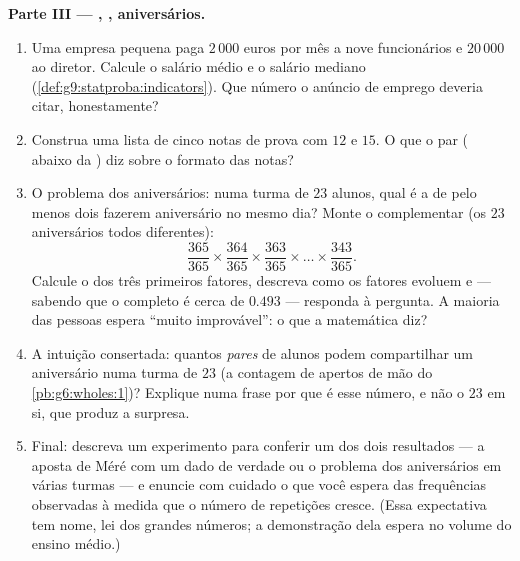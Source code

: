 \begin{problem}
\medskip
\noindent\textbf{Parte III --- , , aniversários.}
\begin{enumerate}[resume]
  \item Uma empresa pequena paga $2\,000$ euros por mês a nove
        funcionários e $20\,000$ ao diretor. Calcule o salário médio e o
        salário mediano (\cref{def:g9:statproba:indicators}). Que número
        o anúncio de emprego deveria citar, honestamente?
  \item Construa uma lista de cinco notas de prova com  $12$ e
         $15$. O que o par ( abaixo da ) diz sobre o
        formato das notas?
  \item O problema dos aniversários: numa turma de $23$ alunos, qual é
        a  de pelo menos dois fazerem aniversário no mesmo
        dia? Monte o complementar (os $23$ aniversários todos
        diferentes):
        \[
        \frac{365}{365} \times \frac{364}{365} \times
        \frac{363}{365} \times \dots \times \frac{343}{365} .
        \]
        Calcule o  dos três primeiros fatores, descreva como os
        fatores evoluem e --- sabendo que o  completo é cerca de
        $0.493$ --- responda à pergunta. A maioria das pessoas espera
        ``muito improvável'': o que a matemática diz?
  \item A intuição consertada: quantos \emph{pares} de alunos podem
        compartilhar um aniversário numa turma de $23$ (a contagem de
        apertos de mão do \cref{pb:g6:wholes:1})? Explique numa frase
        por que é esse número, e não o $23$ em si, que produz a
        surpresa.
  \item Final: descreva um experimento para conferir um dos dois
        resultados --- a aposta de Méré com um dado de verdade ou o
        problema dos aniversários em várias turmas --- e enuncie com
        cuidado o que você espera das frequências observadas à medida
        que o número de repetições cresce. (Essa expectativa tem nome,
        lei dos grandes números; a demonstração dela espera no volume do
        ensino médio.)
\end{enumerate}
\end{problem}
